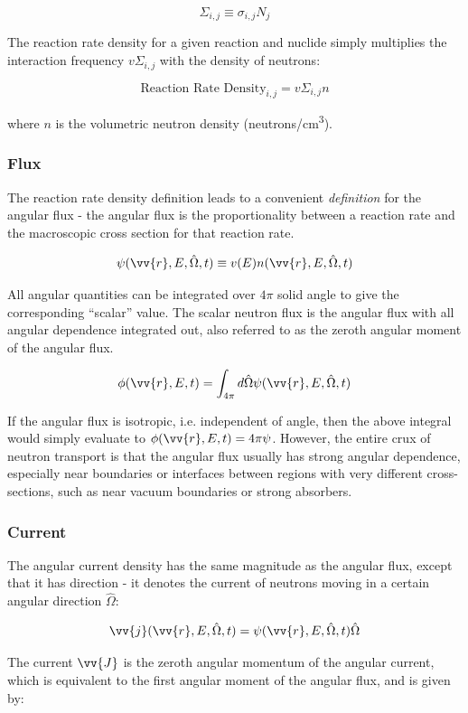 \documentclass[10pt]{article}
\newcommand{\beq}{\begin{equation}}
\newcommand{\eeq}{\end{equation}}
\newcommand{\hO}{\hat{\Omega}}
\newcommand{\spa}{(\vv{r}, E, \hO, t)}
\newcommand{\spas}{(\vv{r},E,t)}
\begin{document}
\begin{flushleft}
\beq
\Sigma_{i,j}\equiv\sigma_{i,j}N_j
\eeq

The reaction rate density for a given reaction and nuclide simply multiplies the interaction frequency \(v\Sigma_{i,j}\) with the density of neutrons:

\beq
\label{eq:ReactionRateDensity}
\textrm{Reaction Rate Density}_{i,j} = v\Sigma_{i,j}n
\eeq

where \(n\) is the volumetric neutron density (neutrons/cm\textsuperscript{3}). 

\subsubsection{Flux}

The reaction rate density definition leads to a convenient \textit{definition} for the angular flux - the angular flux is the proportionality between a reaction rate and the macroscopic cross section for that reaction rate.

\beq
\label{eq:AngularFlux}
\psi\spa \equiv v(E)n\spa
\eeq

All angular quantities can be integrated over \(4\pi\) solid angle to give the corresponding ``scalar'' value. The scalar neutron flux is the angular flux with all angular dependence integrated out, also referred to as the zeroth angular moment of the angular flux.

\beq
\label{eq:ScalarFlux}
\phi\spas = \int_{4\pi}^{} d\hO\psi\spa
\eeq

If the angular flux is isotropic, i.e. independent of angle, then the above integral would simply evaluate to \(\phi\spas=4\pi\psi\). However, the entire crux of neutron transport is that the angular flux usually has strong angular dependence, especially near boundaries or interfaces between regions with very different cross-sections, such as near vacuum boundaries or strong absorbers. 

\subsubsection{Current}

The angular current density has the same magnitude as the angular flux, except that it has direction - it denotes the current of neutrons moving in a certain angular direction \(\hO\):

\beq
\label{eq:AngularCurrent}
\vv{j}\spa = \psi\spa\hO  
\eeq

The current \(\vv{J}\) is the zeroth angular momentum of the angular current, which is equivalent to the first angular moment of the angular flux, and is given by:


\end{flushleft}
\end{document}
